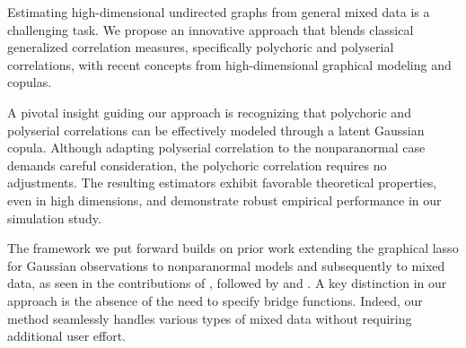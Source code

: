 Estimating high-dimensional undirected graphs from general mixed data is a challenging task. We propose an innovative approach that blends classical generalized correlation measures, specifically polychoric and polyserial correlations, with recent concepts from high-dimensional graphical modeling and copulas.

A pivotal insight guiding our approach is recognizing that polychoric and polyserial correlations can be effectively modeled through a latent Gaussian copula. Although adapting polyserial correlation to the nonparanormal case demands careful consideration, the polychoric correlation requires no adjustments. The resulting estimators exhibit favorable theoretical properties, even in high dimensions, and demonstrate robust empirical performance in our simulation study.

The framework we put forward builds on prior work extending the graphical lasso for Gaussian observations to nonparanormal models and subsequently to mixed data, as seen in the contributions of \citet{Fan17}, followed by \citet{Quan18} and \citet{Feng19}. A key distinction in our approach is the absence of the need to specify bridge functions. Indeed, our method seamlessly handles various types of mixed data without requiring additional user effort. %